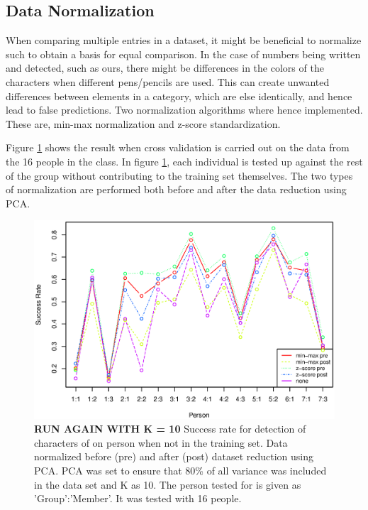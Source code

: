 \subsection{Data Normalization}
\label{sec:DataNormalization}
When comparing multiple entries in a dataset, it might be beneficial to normalize such to obtain a basis for equal comparison.
In the case of numbers being written and detected, such as ours, there might be differences in the colors of the characters when different pens/pencils are used.
This can create unwanted differences between elements in a category, which are else identically, and hence lead to false predictions.
Two normalization algorithms where hence implemented.
These are, min-max normalization and z-score standardization.

Figure \ref{fig:normalization_test_pre-post} shows the result when cross validation is carried out on the data from the 16 people in the class.
In figure \ref{fig:normalization_test_pre-post}, each individual is tested up against the rest of the group without contributing to the training set themselves. 
The two types of normalization are performed both before and after the data reduction using PCA.


\begin{figure}[H]
\centering
\includegraphics[width = 0.95 \textwidth]{graphics/graph_normalization_allppl}
\caption[Comparison of different students.]{\textbf{RUN AGAIN WITH K = 10} Success rate for detection of characters of on person when not in the training set. 
Data normalized before (pre) and after (post) dataset reduction using PCA.
PCA was set to ensure that 80\% of all variance was included in the data set and K as 10.
The person tested for is given as 'Group':'Member'.
It was tested with 16 people.}
\label{fig:normalization_test_pre-post}
\end{figure}

